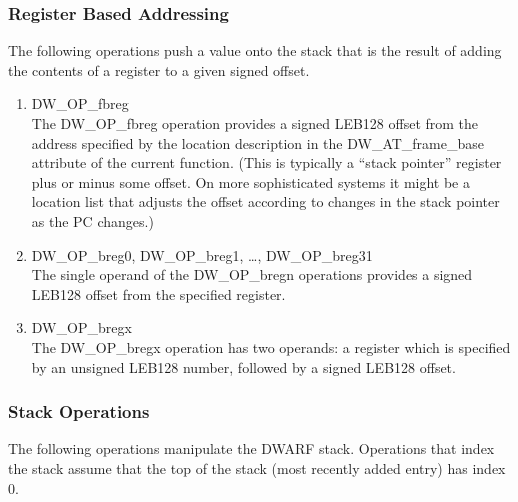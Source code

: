 \subsubsection{Register Based Addressing}
\label{chap:registerbasedaddressing}
The following operations push a value onto the stack that is
the result of adding the contents of a register to a given
signed offset.

\begin{enumerate}[1]

\item DW\-\_OP\-\_fbreg \\
The DW\-\_OP\-\_fbreg operation provides a signed LEB128 offset
from the address specified by the location description in the
DW\-\_AT\-\_frame\-\_base attribute of the current function. (This
is typically a “stack pointer” register plus or minus
some offset. On more sophisticated systems it might be a
location list that adjusts the offset according to changes
in the stack pointer as the PC changes.)

\item DW\-\_OP\-\_breg0, DW\-\_OP\-\_breg1, \dots, DW\-\_OP\-\_breg31\\
The single operand of the DW\-\_OP\-\_bregn operations provides
a signed LEB128 offset from
the specified register.

\item DW\-\_OP\-\_bregx \\
The DW\-\_OP\-\_bregx operation has two operands: a register
which is specified by an unsigned LEB128 number, followed by
a signed LEB128 offset.

\end{enumerate}


\subsubsection{Stack Operations}
\label{chap:stackoperations}
The following operations manipulate the DWARF stack. Operations
that index the stack assume that the top of the stack (most
recently added entry) has index 0.

